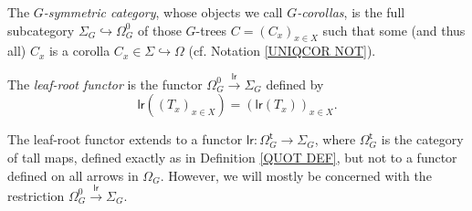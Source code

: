 \documentclass[a4paper,10pt]{article}%
\begin{document}
\begin{definition}
	The \textit{$G$-symmetric category},
	whose objects we call \textit{$G$-corollas}, is the full subcategory 
	$\Sigma_G \hookrightarrow \Omega_{G}^0$ of those $G$-trees
	$C = (C_x)_{x \in X}$ such that some (and thus all) $C_x$ is a corolla $C_x \in \Sigma \hookrightarrow \Omega$
	(cf. Notation \ref{UNIQCOR NOT}).
\end{definition}


\begin{definition}
	The \textit{leaf-root functor} is the functor $\Omega_{G}^0 \xrightarrow{\mathsf{lr}} \Sigma_G$ defined by 
\[
	\mathsf{lr}\left((T_x)_{x \in X}\right)=
	\left(\mathsf{lr}(T_x)\right)_{x \in X}.
\]
\end{definition}


\begin{remark}
	The leaf-root functor extends 
	to a functor $\mathsf{lr} \colon \Omega^{\mathsf{t}}_G \to \Sigma_G$, 
	where $\Omega^{\mathsf{t}}_G$ is the category of tall maps, defined exactly as in Definition \ref{QUOT DEF}, but not to a functor defined on all arrows in $\Omega_G$.
	However, we will mostly be concerned with the restriction  
	$\Omega_{G}^0 \xrightarrow{\mathsf{lr}} \Sigma_G$.
\end{remark}
\end{document}
